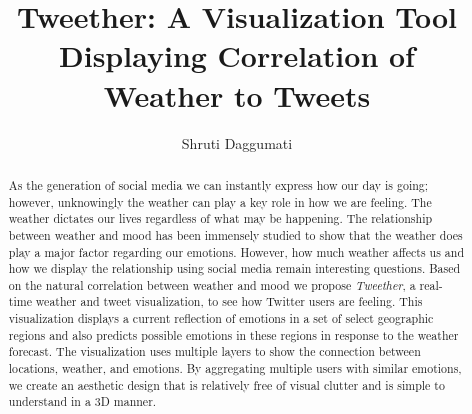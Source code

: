 \documentclass[print]{nuthesis}
\begin{document}
\frontmatter

\title{Tweether: A Visualization Tool Displaying Correlation of \\Weather to Tweets}
\author{Shruti Daggumati}
\maketitle
\begin{abstract}
As the generation of social media we can instantly express how our day is going; however, unknowingly the weather can play a key role in how we are feeling. The weather dictates our lives regardless of what may be happening. The relationship between weather and mood has been immensely studied to show that the weather does play a major factor regarding our emotions. However, how much weather affects us and how we display the relationship using social media remain interesting questions. Based on the natural correlation between weather and mood we propose \emph{Tweether}, a real-time weather and tweet visualization, to see how Twitter users are feeling. This visualization displays a current reflection of emotions in a set of select geographic regions and also predicts possible emotions in these regions in response to the weather forecast. The visualization uses multiple layers to show the connection between locations, weather, and emotions. By aggregating multiple users with similar emotions, we create an aesthetic design that is relatively free of visual clutter and is simple to understand in a 3D manner.
\end{abstract}

\end{document}
